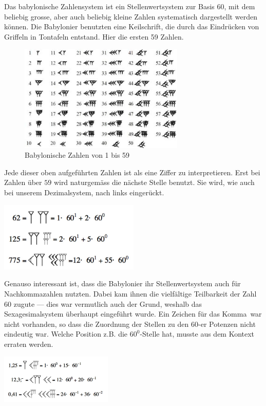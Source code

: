 \documentclass[%
11pt,%
twoside,%
titlepage,%
german,%
]{scrartcl}
\begin{document}
Das babylonische Zahlensystem ist ein Stellenwertsystem zur Basis 60, mit dem beliebig grosse, aber auch beliebig kleine Zahlen systematisch dargestellt werden k\"onnen. Die Babylonier benutzten eine Keilschrift, die durch das Eindr\"ucken von Griffeln in Tontafeln entstand. Hier die ersten 59 Zahlen.
\begin{figure}[h]
\begin{center}
\includegraphics[width=0.7\textwidth]{pictures/babylonzahlen}
\end{center}
\caption{Babylonische Zahlen von 1 bis 59}
\end{figure}
Jede dieser oben aufgef\"uhrten Zahlen ist als eine Ziffer zu interpretieren. Erst bei Zahlen \"uber $59$ wird naturgem\"ass die n\"achste Stelle benutzt. Sie wird, wie auch bei unserem Dezimalsystem, nach links einger\"uckt.
\begin{center}
\includegraphics[width=0.5\textwidth]{pictures/babylongrossezahlen}
\end{center}
Genauso interessant ist, dass die Babylonier ihr Stellenwertsystem auch f\"ur Nachkommazahlen nutzten. Dabei kam ihnen die vielf\"altige Teilbarkeit der Zahl 60 zugute --- dies war vermutlich auch der Grund, weshalb das Sexagesimalsystem \"uberhaupt eingef\"uhrt wurde. Ein Zeichen f\"ur das \glqq Komma\grqq\ war nicht vorhanden, so dass die Zuordnung der Stellen zu den $60$-er Potenzen nicht eindeutig war. Welche Position z.B. die $60^0$-Stelle hat, musste aus dem Kontext erraten werden.
\begin{center}
\includegraphics[width=0.4\textwidth]{pictures/babylonnachkomma}
\end{center}
\end{document}
